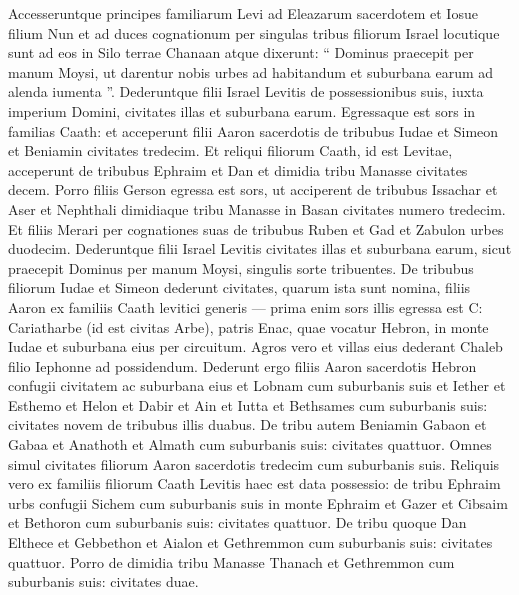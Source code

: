 \begin{biblechapter}
\begin{biblechapter}
\begin{biblechapter}
\begin{biblechapter}
\begin{biblechapter}
\begin{biblechapter}
\begin{biblechapter}
\begin{biblechapter}
\begin{biblechapter}
\begin{biblechapter}
\begin{biblechapter}
\begin{biblechapter}
\begin{biblechapter}
\begin{biblechapter}
\begin{biblechapter}
\begin{biblechapter}
\begin{biblechapter}
\begin{biblechapter}
\begin{biblechapter}
\begin{biblechapter}
\begin{biblechapter}
\verse Accesseruntque principes familiarum Levi ad Eleazarum sacerdotem et Iosue filium Nun et ad duces cognationum per singulas tribus filiorum Israel 
\verse locutique sunt ad eos in Silo terrae Chanaan atque dixerunt: “ Dominus praecepit per manum Moysi, ut darentur nobis urbes ad habitandum et suburbana earum ad alenda iumenta ”. 
\verse Dederuntque filii Israel Levitis de possessionibus suis, iuxta imperium Domini, civitates illas et suburbana earum.
 \verse Egressaque est sors in familias Caath: et acceperunt filii Aaron sacerdotis de tribubus Iudae et Simeon et Beniamin civitates tredecim. 
\verse Et reliqui filiorum Caath, id est Levitae, acceperunt de tribubus Ephraim et Dan et dimidia tribu Manasse civitates decem. 
\verse Porro filiis Gerson egressa est sors, ut acciperent de tribubus Issachar et Aser et Nephthali dimidiaque tribu Manasse in Basan civitates numero tredecim. 
\verse Et filiis Merari per cognationes suas de tribubus Ruben et Gad et Zabulon urbes duodecim. 
\verse Dederuntque filii Israel Levitis civitates illas et suburbana earum, sicut praecepit Dominus per manum Moysi, singulis sorte tribuentes.
 \verse De tribubus filiorum Iudae et Simeon dederunt civitates, quarum ista sunt nomina, 
\verse filiis Aaron ex familiis Caath levitici generis — prima enim sors illis egressa est C: 
\verse Cariatharbe (id est civitas Arbe), patris Enac, quae vocatur Hebron, in monte Iudae et suburbana eius per circuitum. 
\verse Agros vero et villas eius dederant Chaleb filio Iephonne ad possidendum. 
\verse Dederunt ergo filiis Aaron sacerdotis Hebron confugii civitatem ac suburbana eius et Lobnam cum suburbanis suis 
\verse et Iether et Esthemo 
\verse et Helon et Dabir 
\verse et Ain et Iutta et Bethsames cum suburbanis suis: civitates novem de tribubus illis duabus. 
\verse De tribu autem Beniamin Gabaon et Gabaa 
 \verse et Anathoth et Almath cum suburbanis suis: civitates quattuor.
 \verse Omnes simul civitates filiorum Aaron sacerdotis tredecim cum suburbanis suis.
 \verse Reliquis vero ex familiis filiorum Caath Levitis haec est data possessio: 
 \verse de tribu Ephraim urbs confugii Sichem cum suburbanis suis in monte Ephraim et Gazer 
\verse et Cibsaim et Bethoron cum suburbanis suis: civitates quattuor. 
 \verse De tribu quoque Dan Elthece et Gebbethon 
\verse et Aialon et Gethremmon cum suburbanis suis: civitates quattuor. 
\verse Porro de dimidia tribu Manasse Thanach et Gethremmon cum suburbanis suis: civitates duae. 

\end{biblechapter}
\end{biblechapter}
\end{biblechapter}
\end{biblechapter}
\end{biblechapter}
\end{biblechapter}
\end{biblechapter}
\end{biblechapter}
\end{biblechapter}
\end{biblechapter}
\end{biblechapter}
\end{biblechapter}
\end{biblechapter}
\end{biblechapter}
\end{biblechapter}
\end{biblechapter}
\end{biblechapter}
\end{biblechapter}
\end{biblechapter}
\end{biblechapter}
\end{biblechapter}
